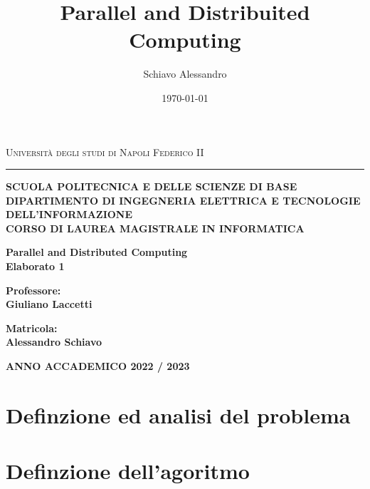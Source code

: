 \documentclass[a4paper,11pt]{book}
\title{Parallel and Distribuited Computing}
\author{Schiavo Alessandro}
\date{\today}
\begin{document}
\begin{titlepage}
    \begin{center}
        {{\Large
        {\textsc{Università degli studi di Napoli Federico II}}}} 
        \rule[0.1cm]{15.8cm}{0.1mm}
        {\small{\bf SCUOLA POLITECNICA E DELLE SCIENZE DI BASE\\  \vspace{3mm}
        DIPARTIMENTO DI INGEGNERIA ELETTRICA E TECNOLOGIE
DELL’INFORMAZIONE \\  \vspace{3mm}
CORSO DI LAUREA MAGISTRALE IN INFORMATICA}}
    \end{center}
    \vspace{15mm}
    \begin{center}
        {\LARGE{\bf Parallel and Distributed Computing }}\\
        \vspace{3mm}
        {\LARGE{\bf Elaborato 1}}\\
    \end{center}
    \vspace{40mm}
    \par
    \noindent
    \begin{minipage}[t]{0.47\textwidth}
        {\large{\bf Professore:\\
        Giuliano Laccetti}}
    \end{minipage}
    \hfill
    \begin{minipage}[t]{0.47\textwidth}
        \raggedleft
        {\large{\bf Matricola:\\ Alessandro Schiavo}}
    \end{minipage}
    \vspace{20mm}
    \begin{center}
        {\large{\bf ANNO ACCADEMICO 2022 / 2023 }}
    \end{center}
\end{titlepage}

\tableofcontents

\chapter{Definzione ed analisi del problema}
\chapter{Definzione dell'agoritmo}
\end{document}
